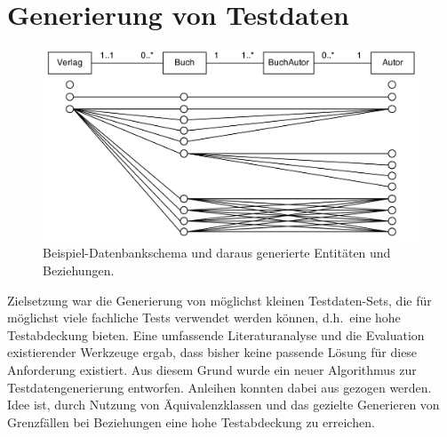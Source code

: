 \section{Generierung von Testdaten}


	\begin{figure}[tb]
		\begin{center}
			\includegraphics[width=11.5cm]{images/generiert.png}
			\caption{\label{generiert}Beispiel-Datenbankschema und daraus generierte Entitäten und Beziehungen.}
		\end{center}
	\end{figure}


Zielsetzung war die Generierung von möglichst kleinen Testdaten-Sets, die für möglichst viele fachliche Tests verwendet werden können, d.h.~eine hohe Testabdeckung bieten. 
%
%
Eine umfassende Literaturanalyse und die Evaluation existierender Werkzeuge ergab, dass bisher keine passende Lösung für diese Anforderung existiert.
%
%
Aus diesem Grund wurde ein neuer Algorithmus zur Testdatengenerierung entworfen. 
%
Anleihen konnten dabei aus \cite{Houkjaer:2006:SRD:1182635.1164254} gezogen werden.
%
Idee ist, durch Nutzung von Äquivalenz\-klas\-sen und das gezielte Generieren von Grenzfällen bei Beziehungen eine hohe Testabdeckung zu erreichen.


